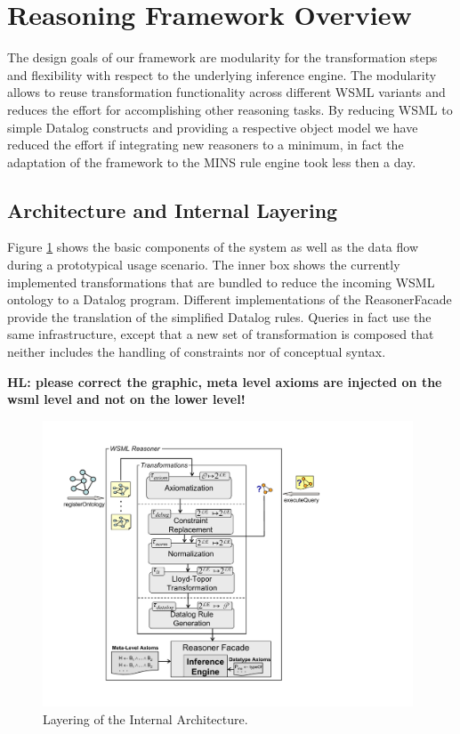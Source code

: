 \section{Reasoning Framework Overview\label{sec:framework}}

The design goals of our framework are modularity for the
transformation steps and flexibility with respect to the underlying
inference engine. The modularity allows to reuse transformation
functionality across different WSML variants and reduces the effort
for accomplishing other reasoning tasks. By reducing WSML to simple
Datalog constructs and providing a respective object model we have
reduced the effort if integrating new reasoners to a minimum, in
fact the adaptation of the framework to the MINS rule engine took
less then a day.

\subsection{Architecture and Internal Layering}
Figure \ref{fig:layering} shows the basic components of the system
as well as the data flow during a prototypical usage scenario. The
inner box shows the currently implemented transformations that are
bundled to reduce the incoming WSML ontology to a Datalog program.
Different implementations of the ReasonerFacade provide the
translation of the simplified Datalog rules. Queries in fact use the
same infrastructure, except that a new set of transformation is
composed that neither includes the handling of constraints nor of
conceptual syntax.

{\bf HL: please correct the graphic, meta level axioms are injected
on the wsml level and not on the lower level!}

\begin{figure}[h]
    \includegraphics[width=11cm]{figures/layering}
    \centering
    \caption{Layering of the Internal Architecture. \label{fig:layering}}
\end{figure}


